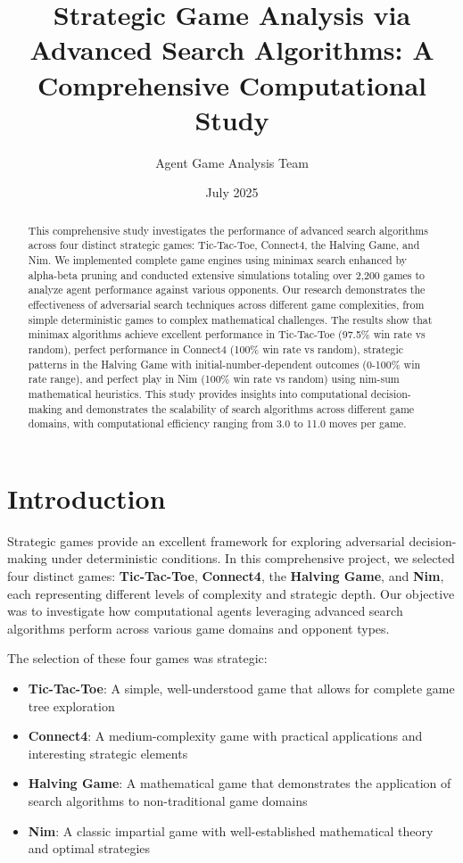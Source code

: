 \documentclass[12pt]{article}
\title{Strategic Game Analysis via Advanced Search Algorithms: A Comprehensive Computational Study}
\author{Agent Game Analysis Team}
\date{July 2025}
\begin{document}
\maketitle

\begin{abstract}
This comprehensive study investigates the performance of advanced search algorithms across four distinct strategic games: Tic-Tac-Toe, Connect4, the Halving Game, and Nim. We implemented complete game engines using minimax search enhanced by alpha-beta pruning and conducted extensive simulations totaling over 2,200 games to analyze agent performance against various opponents. Our research demonstrates the effectiveness of adversarial search techniques across different game complexities, from simple deterministic games to complex mathematical challenges. The results show that minimax algorithms achieve excellent performance in Tic-Tac-Toe (97.5\% win rate vs random), perfect performance in Connect4 (100\% win rate vs random), strategic patterns in the Halving Game with initial-number-dependent outcomes (0-100\% win rate range), and perfect play in Nim (100\% win rate vs random) using nim-sum mathematical heuristics. This study provides insights into computational decision-making and demonstrates the scalability of search algorithms across different game domains, with computational efficiency ranging from 3.0 to 11.0 moves per game.
\end{abstract}

\section{Introduction}

Strategic games provide an excellent framework for exploring adversarial decision-making under deterministic conditions. In this comprehensive project, we selected four distinct games: \textbf{Tic-Tac-Toe}, \textbf{Connect4}, the \textbf{Halving Game}, and \textbf{Nim}, each representing different levels of complexity and strategic depth. Our objective was to investigate how computational agents leveraging advanced search algorithms perform across various game domains and opponent types.

The selection of these four games was strategic:
\begin{itemize}
    \item \textbf{Tic-Tac-Toe}: A simple, well-understood game that allows for complete game tree exploration
    \item \textbf{Connect4}: A medium-complexity game with practical applications and interesting strategic elements
    \item \textbf{Halving Game}: A mathematical game that demonstrates the application of search algorithms to non-traditional game domains
    \item \textbf{Nim}: A classic impartial game with well-established mathematical theory and optimal strategies
\end{itemize}
\end{document}
